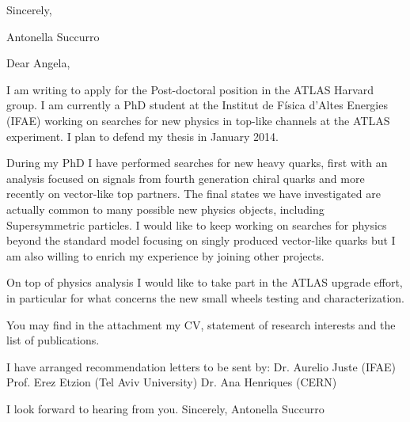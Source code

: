 Sincerely,

Antonella Succurro








Dear Angela,

I am writing to apply for the Post-doctoral position in the ATLAS Harvard group.
I am currently a PhD student at the Institut de Física d'Altes Energies (IFAE)
working on searches for new physics in top-like channels at the ATLAS experiment.
I plan to defend my thesis in January 2014.

During my PhD I have performed searches for new heavy quarks, first with an analysis
focused on signals from fourth generation chiral quarks and more recently
on vector-like top partners. The final states we 
have investigated are actually common to many possible new physics objects, including
Supersymmetric particles. I would like to keep working on searches for physics 
beyond the standard model focusing on singly produced vector-like quarks but I am
also willing to enrich my experience by joining other projects.

On top of physics analysis I would like to take part in the ATLAS upgrade
effort, in particular for what concerns the new small wheels testing
and characterization.

You may find in the attachment my CV, statement of research interests and the list
of publications.

I have arranged recommendation letters to be sent by:
Dr. Aurelio Juste (IFAE)
Prof. Erez Etzion (Tel Aviv University)
Dr. Ana Henriques (CERN)

I look forward to hearing from you.  
Sincerely,
Antonella Succurro
